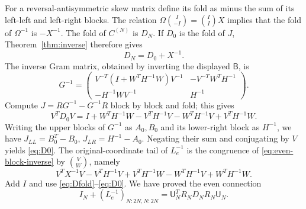 \documentclass[11pt,a4paper]{amsart}
\theoremstyle{remark}\newtheorem{remark}[theorem]{Remark}
\numberwithin{equation}{section}
\newcommand{\U}{\mathsf U}
\newcommand{\B}{\mathsf B}
\begin{document}
For a reversal-antisymmetric skew matrix define its fold as minus the sum of its left-left and left-right blocks. The relation $\Omega\binom I{-I}=\binom II X$ implies that the fold of $\Omega^{-1}$ is $-X^{-1}$. The fold of $C^{(N)}$ is $D_N$. If $D_0$ is the fold of $J$, Theorem~\ref{thm:inverse} therefore gives
\begin{equation}\label{eq:Dfold}D_N=D_0+X^{-1}.\end{equation}
The inverse Gram matrix, obtained by inverting the displayed $\B$, is
\[
 G^{-1}=\begin{pmatrix}
 V^{-T}(I+W^TH^{-1}W)V^{-1}&-V^{-T}W^TH^{-1}\\
 -H^{-1}WV^{-1}&H^{-1}
 \end{pmatrix}.
\]
Compute $J=RG^{-1}-G^{-1}R$ block by block and fold; this gives
\begin{equation}\label{eq:D0}
 V^TD_0V=I+W^TH^{-1}W-V^TH^{-1}V-W^TH^{-1}V+V^TH^{-1}W.
\end{equation}
Writing the upper blocks of $G^{-1}$ as $A_0,B_0$ and its lower-right block as $H^{-1}$, we have $J_{LL}=B_0^T-B_0$, $J_{LR}=H^{-1}-A_0$. Negating their sum and conjugating by $V$ yields \eqref{eq:D0}.
The original-coordinate tail of $L_e^{-1}$ is the congruence of \eqref{eq:even-block-inverse} by $\binom VW$, namely
\[
 V^TX^{-1}V-V^TH^{-1}V+V^TH^{-1}W-W^TH^{-1}V+W^TH^{-1}W.
\]
Add $I$ and use \eqref{eq:Dfold}--\eqref{eq:D0}. We have proved the even connection
\begin{equation}\label{eq:even-connection}
 I_N+(L_e^{-1})_{N:2N,N:2N}=\U_N^TR_ND_NR_N\U_N.
\end{equation}
\end{document}
